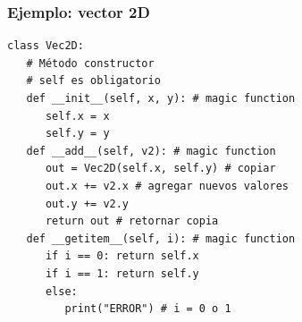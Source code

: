 \documentclass[14pt,aspectratio=169,xcolor=dvipsnames]{beamer}
\begin{document}
\begin{frame}[fragile]\frametitle{Ejemplo: vector 2D}
    \begin{footnotesize}
    \begin{verbatim}
class Vec2D:
   # Método constructor
   # self es obligatorio
   def __init__(self, x, y): # magic function
      self.x = x 
      self.y = y
   def __add__(self, v2): # magic function
      out = Vec2D(self.x, self.y) # copiar
      out.x += v2.x # agregar nuevos valores
      out.y += v2.y
      return out # retornar copia
   def __getitem__(self, i): # magic function
      if i == 0: return self.x
      if i == 1: return self.y
      else:
         print("ERROR") # i = 0 o 1
    \end{verbatim}
    \end{footnotesize}
\end{frame}
\end{document}
